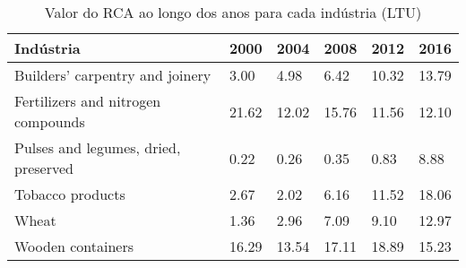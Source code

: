 \begin{table}
\centering
\caption{Valor do RCA ao longo dos anos para cada indústria (LTU)}
\begin{tabular}{p{6cm}p{1.5cm}p{1.5cm}p{1.5cm}p{1.5cm}p{1.5cm}}
\toprule
                           Indústria &  2000 &  2004 &  2008 &  2012 &  2016 \\
\midrule
     Builders' carpentry and joinery &  3.00 &  4.98 &  6.42 & 10.32 & 13.79 \\
  Fertilizers and nitrogen compounds & 21.62 & 12.02 & 15.76 & 11.56 & 12.10 \\
Pulses and legumes, dried, preserved &  0.22 &  0.26 &  0.35 &  0.83 &  8.88 \\
                    Tobacco products &  2.67 &  2.02 &  6.16 & 11.52 & 18.06 \\
                               Wheat &  1.36 &  2.96 &  7.09 &  9.10 & 12.97 \\
                   Wooden containers & 16.29 & 13.54 & 17.11 & 18.89 & 15.23 \\
\bottomrule
\end{tabular}
\end{table}
